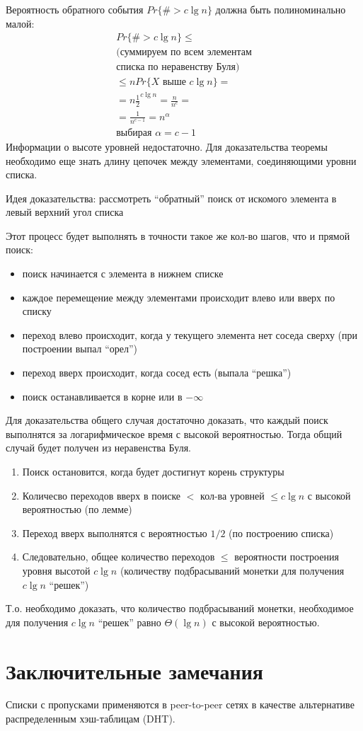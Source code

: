 \documentclass[11pt]{article}
\begin{document}
Вероятность обратного события $Pr\{\# > c\lg n\}$ должна быть полиноминально малой:
\begin{align*}
  Pr\{\# > c \lg n \} \leqslant \\
  \text{(суммируем по всем элементам} \\
  \text{списка по неравенству Буля)} \\
  \leqslant n Pr\{X \text{ выше }c \lg n\} = \\
  = n {\frac{1}{2}}^{c\lg n} = \frac{n}{n^c} = \\
  = \frac{1}{n^{c-1}} = n^\alpha \\
  \text{выбирая }\alpha = c-1
\end{align*}
Информации о высоте уровней недостаточно. Для доказательства теоремы необходимо еще знать длину цепочек между элементами, соединяющими уровни списка.

Идея доказательства: рассмотреть ``обратный'' поиск от искомого элемента в левый верхний угол списка

Этот процесс будет выполнять в точности такое же кол-во шагов, что и прямой поиск:
\begin{itemize}
\item поиск начинается с элемента в нижнем списке
\item каждое перемещение между элементами происходит влево или вверх по списку
\item переход влево происходит, когда у текущего элемента нет соседа сверху (при построении выпал ``орел'')
\item переход вверх происходит, когда сосед есть (выпала ``решка'')
\item поиск останавливается в корне или в $-\infty$
\end{itemize}
Для доказательства общего случая достаточно доказать, что каждый поиск выполнятся за логарифмическое время с высокой вероятностью. Тогда общий случай будет получен из неравенства Буля.
\begin{enumerate}
\item Поиск остановится, когда будет достигнут корень структуры
\item Количесво переходов вверх в поиске $<$ кол-ва уровней $\leqslant c \lg n$ с высокой вероятностью (по лемме)
\item Переход вверх выполнятся с вероятностью $1/2$ (по построению списка)
\item Следовательно, общее количество переходов $\leqslant$ вероятности построения уровня высотой $c \lg n$ (количеству подбрасываний монетки для получения $c \lg n$ ``решек'')
\end{enumerate}
Т.о. необходимо доказать, что количество подбрасываний монетки, необходимое для получения $c \lg n$ ``решек'' равно $\Theta(\lg n)$ с высокой вероятностью.


\section{Заключительные замечания}

Списки с пропусками применяются в peer-to-peer сетях в качестве альтернативе распределенным хэш-таблицам (DHT).
\end{document}

